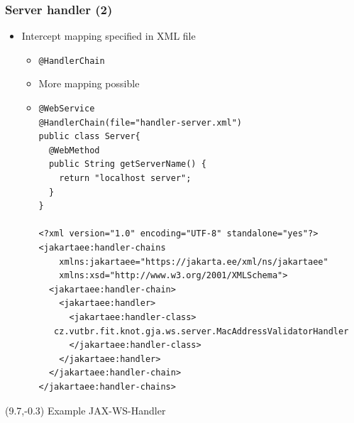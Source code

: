 \documentclass[10pt,xcolor=pdflatex]{beamer}
\begin{document}
\begin{frame}[containsverbatim]\frametitle{Server handler (2)}
\begin{itemize}
    \item Intercept mapping specified in XML file	
      \begin{itemize}
    	\item \texttt{@HandlerChain}
		\item More mapping possible
        \item[] \begin{footnotesize}
      \begin{verbatim}
@WebService
@HandlerChain(file="handler-server.xml")
public class Server{
  @WebMethod
  public String getServerName() {
    return "localhost server";
  }
}

<?xml version="1.0" encoding="UTF-8" standalone="yes"?>
<jakartaee:handler-chains
    xmlns:jakartaee="https://jakarta.ee/xml/ns/jakartaee"
    xmlns:xsd="http://www.w3.org/2001/XMLSchema">
  <jakartaee:handler-chain>
    <jakartaee:handler>
      <jakartaee:handler-class>
   cz.vutbr.fit.knot.gja.ws.server.MacAddressValidatorHandler
      </jakartaee:handler-class>
    </jakartaee:handler>
  </jakartaee:handler-chain>
</jakartaee:handler-chains>
\end{verbatim}
      \end{footnotesize}
      \end{itemize}   
\end{itemize}
\begin{textblock}{5}(9.7,-0.3)
    {\footnotesize Example JAX-WS-Handler}
\end{textblock}
\end{frame}
\end{document}
